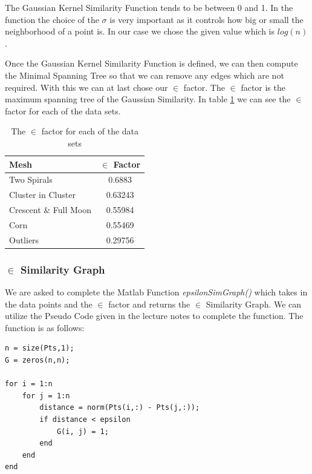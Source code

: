 \documentclass[unicode,11pt,a4paper,oneside,numbers=endperiod,openany]{scrartcl}
\begin{document}
The Gaussian Kernel Similarity Function tends to be between 0 and 1. In the function the choice of the $\sigma$ is very important as it controls how big or small the neighborhood of a point is. In our case we chose the given value which is $log(n)$.

Once the Gaussian Kernel Similarity Function is defined, we can then compute the Minimal Spanning Tree so that we can remove any edges which are not required. With this we can at last chose our $\in$ factor. The $\in$ factor is the maximum spanning tree of the Gaussian Similarity. In table \ref{tab:in-factor} we can see the $\in$ factor for each of the data sets.

\begin{table}[H]
    \centering
    \begin{tabular}{|l|c|}
        \hline
        \textbf{Mesh}         & \textbf{$\in$ Factor} \\
        \hline
        Two Spirals           & 0.6883                \\
        Cluster in Cluster    & 0.63243               \\
        Crescent \& Full Moon & 0.55984               \\
        Corn                  & 0.55469               \\
        Outliers              & 0.29756               \\
        \hline
    \end{tabular}
    \caption{The $\in$ factor for each of the data sets}
    \label{tab:in-factor}
\end{table}

\subsubsection{$\in$ Similarity Graph}
We are asked to complete the Matlab Function \textit{epsilonSimGraph()} which takes in the data points and the $\in$ factor and returns the $\in$ Similarity Graph. We can utilize the Pseudo Code given in the lecture notes to complete the function. The function is as follows:

\begin{lstlisting}
n = size(Pts,1);
G = zeros(n,n);

for i = 1:n
    for j = 1:n
        distance = norm(Pts(i,:) - Pts(j,:));
        if distance < epsilon
            G(i, j) = 1;
        end
    end
end    
\end{lstlisting}
\end{document}
